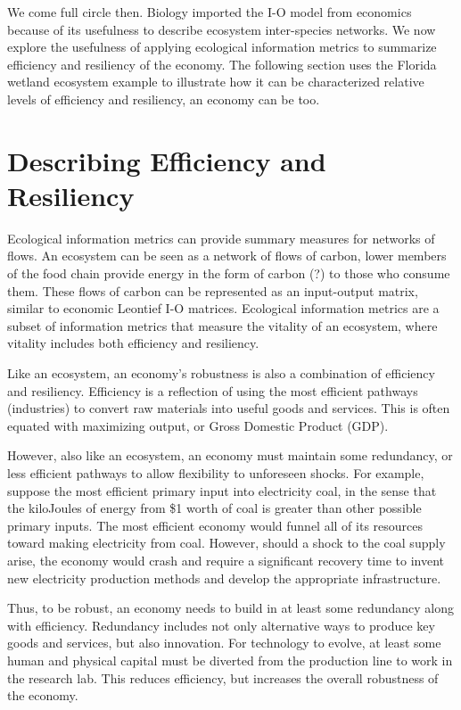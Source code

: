 \documentclass{article}
\begin{document}
We come full circle then. Biology imported the I-O model 
from economics because of its usefulness to describe
ecosystem inter-species networks. We now explore
the usefulness of applying ecological
information metrics to summarize efficiency and
resiliency of the economy. The following section
uses the Florida wetland ecosystem example to illustrate
how it can be characterized  relative levels of efficiency and resiliency, an economy can be too.

\section{Describing Efficiency and Resiliency}

Ecological information metrics can provide summary measures for networks 
of flows. An ecosystem can be seen as a network of flows of 
carbon, lower members of the food chain provide energy in 
the form of carbon (?)
to those who consume them. These flows of carbon can be
represented as an input-output matrix, similar to economic
Leontief I-O matrices. Ecological information metrics are 
a subset of information metrics that measure the vitality
of an ecosystem, where vitality includes both efficiency and
resiliency. 

Like an ecosystem, an economy's robustness is also a combination
of efficiency and resiliency. Efficiency is a reflection of
using the most efficient pathways (industries) to convert
raw materials into useful goods and services. This is 
often equated with maximizing output, or Gross Domestic Product (GDP).

However, also like an ecosystem, an economy must maintain
some redundancy, or less efficient pathways to allow
flexibility to unforeseen shocks. For example, suppose the most
efficient primary input into electricity coal, in the sense that the 
kiloJoules of energy from \$1 worth of coal is greater than other
possible primary inputs. The most efficient economy would
funnel all of its resources toward making electricity from coal.
However, should a shock to the coal supply arise, the economy
would crash and require a significant recovery time to 
invent new electricity production methods and develop
the appropriate infrastructure.

Thus, to be robust, an economy needs to build in
at least some redundancy along with efficiency. Redundancy
includes not only alternative ways to produce key goods and
services, but also innovation. For technology to evolve,
at least some human and physical capital must be diverted from
the production line to work in the research lab. This reduces
efficiency, but increases the overall robustness of the economy.
\end{document}

